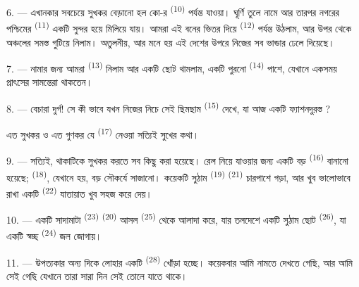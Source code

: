 \VUsaut{3.0mm}
\VUsaut{3.0mm}

6. --- এখানকার সবচেয়ে সুখকর বেড়ানো হল কো-র  \textsuperscript{(10)}
পর্যন্ত যাওয়া।  ঘূর্ণি তুলে নামে আর তারপর নগরের পশ্চিমের
 \textsuperscript{(11)} একটি সুন্দর  হয়ে
মিলিয়ে যায়। আমরা এই বনের ভিতর দিয়ে 
\textsuperscript{(12)} পর্যন্ত উঠলাম, আর  উপর থেকে অঞ্চলের সমস্ত
 গুটিয়ে নিলাম। 
অতুলনীয়, আর মনে হয়  এই দেশের উপরে নিজের সব ভান্ডার ঢেলে
দিয়েছে।

7. --- নামার জন্য আমরা  \textsuperscript{(13)} নিলাম আর একটি
ছোট  থামলাম, একটি পুরনো 
 \textsuperscript{(14)} পাশে, যেখানে একসময় প্রাৎসের
সামন্তেরা থাকতেন।

8. --- বেচারা দুর্গ! সে কী ভাবে যখন নিজের নিচে সেই ছিমছাম 
\textsuperscript{(15)} দেখে, যা আজ একটি ফ্যাশনদুরস্ত ?

 এত সুখকর ও  এত গুণকর যে
 \textsuperscript{(17)} নেওয়া  সত্যিই
সুখের কথা।

\VUsaut{3.0mm}
\VUsaut{3.0mm}

9. --- সত্যিই, থাকাটিকে সুখকর করতে সব কিছু করা হয়েছে। রেল নিয়ে যাওয়ার জন্য
একটি বড়  \textsuperscript{(16)} বানানো হয়েছে;
  \textsuperscript{(18)}, যেখানে
 হয়, বড় সৌকর্যে সাজানো। কয়েকটি সুঠাম 
\textsuperscript{(19)}  \textsuperscript{(21)} চারপাশে গড়া, আর
খুব ভালোভাবে রাখা একটি  \textsuperscript{(22)} যাতায়াত খুব সহজ
করে দেয়।

10. --- একটি সাদামাটা  \textsuperscript{(23)} 
\textsuperscript{(20)} আসল  \textsuperscript{(25)} থেকে আলাদা করে,
যার তলদেশে একটি সুঠাম ছোট  \textsuperscript{(26)}, যা একটি স্বচ্ছ
 \textsuperscript{(24)} জল জোগায়।

11. --- উপত্যকার অন্য দিকে লোহার একটি  \textsuperscript{(28)} খোঁড়া
হচ্ছে। কয়েকবার আমি   নামতে দেখতে গেছি,
আর আমি সেই  গেছি যেখানে তারা সারা দিন সেই 
তোলে যাতে  থাকে।

